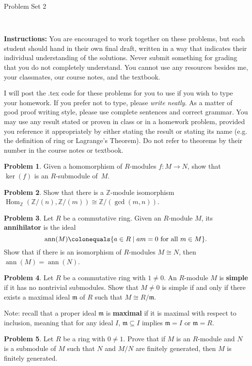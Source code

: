 \documentclass[11pt]{article}
\title{}
\date{\vspace{-0.5in}}
\newcommand{\Z}{\mathbb{Z}}
\DeclareMathOperator{\Hom}{Hom}
\DeclareMathOperator{\ann}{ann}
\newcommand{\m}{\mathfrak{m}}
\theoremstyle{definition}
\newtheorem{problem}{Problem}
\begin{document}
\thispagestyle{fancy}
\pagestyle{fancy}

\vspace{3em}

\begin{center}
	{\LARGE Problem Set 2}
\end{center}

\

\noindent
{\bf Instructions:}
You are encouraged to work together on these problems, but each student should hand in their own final draft, written in a way that indicates their individual understanding of the solutions. Never submit something for grading that you do not completely understand. You cannot use any resources besides me, your classmates, our course notes, and the textbook.


I will post the .tex code for these problems for you to use if you wish to type your homework. If you prefer not to type, please  {\em write neatly}. As a matter of good proof writing style, please use complete sentences and correct grammar. You may use any result  stated or proven in class or in a homework problem, provided you reference it appropriately by either stating the result or stating its name (e.g. the definition of ring or Lagrange's Theorem). Do not refer to theorems by their number in the course notes or textbook.


\vspace{2em}





\begin{problem}
	Given a homomorphism of $R$-modules $f\!: M \to N$, show that $\ker(f)$ is an $R$-submodule of~$M$.
\end{problem}


\begin{problem}
	Show that there is a $\Z$-module isomorphism $\Hom_\Z(\Z/(n),\Z/(m)) \cong \Z / (\gcd(m,n))$.
\end{problem}


\begin{problem}
Let $R$ be a commutative ring. Given an $R$-module $M$, its {\bf annihilator} is the ideal 
$$\ann(M) \colonequals \{ a \in R \mid am = 0 \textrm{ for all } m \in M \}.$$
Show that if there is an isomorphism of $R$-modules $M \cong N$, then $\ann(M) = \ann(N)$.
\end{problem}



\begin{problem}
Let $R$ be a commutative ring with $1 \neq 0$. An $R$-module $M$ is {\bf simple} if it has no nontrivial submodules.
Show that $M \neq 0$ is simple if and only if there exists a maximal ideal $\m$ of $R$ such that $M \cong R/\m$.

\noindent
Note: recall that a proper ideal $\m$ is {\bf maximal} if it is maximal with respect to inclusion, meaning that for any ideal $I$, $\m \subseteq I$ implies $\m = I$ or $\m = R$.
\end{problem}






\begin{problem}
	Let $R$ be a ring with $0\neq 1$. Prove that if $M$ is an $R$-module and $N$ is a submodule of $M$ such that $N$ and $M/N$ are finitely generated, then $M$ is finitely generated.
\end{problem}
\end{document}
